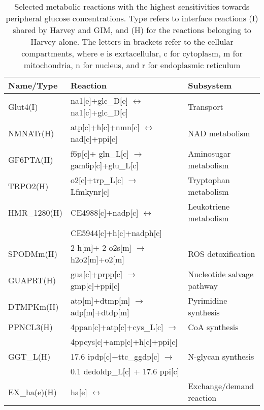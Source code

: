 \begin{table}[h]
\caption[Selected metabolic reactions with the highest sensitivities towards peripheral glucose concentrations.]{Selected metabolic reactions with the highest sensitivities towards peripheral glucose concentrations. Type refers to interface reactions (I) shared by Harvey and GIM, and (H) for the reactions belonging to Harvey alone. The letters in brackets refer to the cellular compartments, where e is exrtacellular, c for cytoplasm, m for mitochondria, n for nucleus, and r for endoplasmic reticulum}
\begin{center}
	\begin{tabular*}{\textwidth}{l @{\extracolsep{\fill}} ll}
	\hline
	Name/Type  & Reaction & Subsystem       \\ 
	\hline
	Glut4(I)                   & na1[e]+glc\_D[e] $\leftrightarrow$ na1[c]+glc\_D[c] & Transport      \\
	NMNATr(H)                      & atp[c]+h[c]+nmn[c] $\leftrightarrow$ nad[c]+ppi[c] & NAD metabolism         \\
	GF6PTA(H)            			& f6p[c]+ gln\_L[c] $\rightarrow$ gam6p[c]+glu\_L[c] & Aminosugar metabolism         \\
	TRPO2(H)             			& o2[c]+trp\_L[c] $\rightarrow$ Lfmkynr[c] & Tryptophan metabolism        \\
    HMR\_1280(H)          			& CE4988[c]+nadp[c] $\leftrightarrow$  & Leukotriene metabolism       \\
    & CE5944[c]+h[c]+nadph[c] &\\
	SPODMm(H)            			& 2 h[m]+ 2 o2s[m] $\rightarrow$ h2o2[m]+o2[m] & ROS detoxification        \\
	GUAPRT(H)            			& gua[c]+prpp[c] $\rightarrow$ gmp[c]+ppi[c] & Nucleotide salvage pathway        \\
	DTMPKm(H)            			& atp[m]+dtmp[m] $\rightarrow$ adp[m]+dtdp[m] & Pyrimidine synthesis        \\
	PPNCL3(H)           			& 4ppan[c]+atp[c]+cys\_L[c] $\rightarrow$  & CoA synthesis      \\
	                                & 4ppcys[c]+amp[c]+h[c]+ppi[c]             & \\
	GGT\_L(H)             			& 17.6 ipdp[c]+ttc\_ggdp[c] $\rightarrow$ & N-glycan synthesis        \\
	                                &  0.1 dedoldp\_L[c] + 17.6 ppi[c] & \\
	EX\_ha(e)(H)          			& ha[e] $\leftrightarrow$ & Exchange/demand reaction       \\

\end{tabular*}
\end{center}
\end{table}
